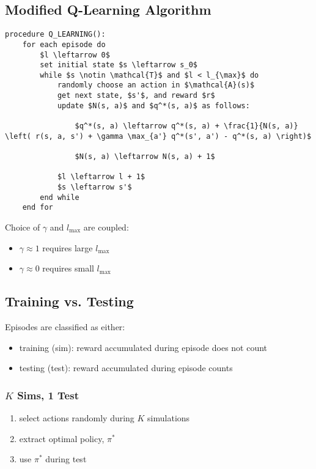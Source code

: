 \subsection{Modified Q-Learning Algorithm}
\begin{algo}
\begin{lstlisting}
procedure Q_LEARNING():
    for each episode do
        $l \leftarrow 0$
        set initial state $s \leftarrow s_0$
        while $s \notin \mathcal{T}$ and $l < l_{\max}$ do
            randomly choose an action in $\mathcal{A}(s)$
            get next state, $s'$, and reward $r$
            update $N(s, a)$ and $q^*(s, a)$ as follows:

                $q^*(s, a) \leftarrow q^*(s, a) + \frac{1}{N(s, a)} \left( r(s, a, s') + \gamma \max_{a'} q^*(s', a') - q^*(s, a) \right)$
            
                $N(s, a) \leftarrow N(s, a) + 1$
            
            $l \leftarrow l + 1$
            $s \leftarrow s'$
        end while
    end for
\end{lstlisting}        
\end{algo}

\begin{notes}
    Choice of $\gamma$ and $l_{\max}$ are coupled:
    \begin{itemize}
        \item $\gamma \approx 1$ requires large $l_{\max}$
        \item $\gamma \approx 0$ requires small $l_{\max}$
    \end{itemize}
\end{notes}
\newpage


\subsection{Training vs. Testing}
\begin{notes}
    Episodes are classified as either:
    \begin{itemize}
        \item training (sim): reward accumulated during episode does not count
        \item testing (test): reward accumulated during episode counts
    \end{itemize}
\end{notes}

\subsubsection{$K$ Sims, 1 Test}
\begin{notes}
    \begin{enumerate}
        \item select actions randomly during $K$ simulations
        \item extract optimal policy, $\pi^*$
        \item use $\pi^*$ during test
    \end{enumerate}    
\end{notes}

